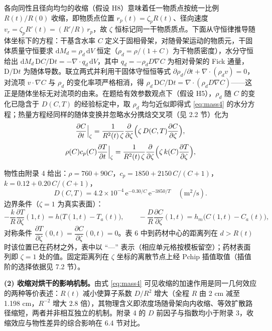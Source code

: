 \documentclass[12pt,a4paper]{ctexart}
\newcommand{\pdd}[2]{\dfrac{\partial #1}{\partial #2}}
\begin{document}
各向同性且径向均匀的收缩（假设 H8）意味着任一物质点按统一比例 $R(t)/R(0)$ 收缩，即物质点位置 $r_p(t)=\zeta_pR(t)$、径向速度 $v_r=\zeta_pR'(t)=(R'/R)\,r_p$，故 $\zeta$ 恒标记同一干物质质点。下面从守恒律推导随体坐标下的方程：干基含水率 $C$ 定义于固相骨架，对随骨架运动的物质元，干固体质量守恒要求 $\mathrm{d}M_d=\rho_d\,\mathrm{d}V$ 恒定（$\rho_d=\rho/(1+C)$ 为干物质密度），水分守恒给出 $\mathrm{d}M_d\,\mathrm{D}C/\mathrm{D}t=-\nabla\cdot q_d\,\mathrm{d}V$，其中 $q_d=-\rho_d D\nabla C$ 为相对骨架的 Fick 通量\cite{whitaker}，$\mathrm{D}/\mathrm{D}t$ 为随体导数。联立两式并利用干固体守恒恒等式 $\partial\rho_d/\partial t+\nabla\cdot(\rho_d v)=0$，对流项 $v\cdot\nabla C$ 与 $\rho_d$ 的变化率项严格相消，得 $\rho_d\,\mathrm{D}C/\mathrm{D}t=\nabla\cdot(\rho_d D\nabla C)$——这正是随体坐标无对流项的由来。在题给有效参数观点下（假设 H5），$\rho_d$ 随 $C$ 的变化已隐含于 $D(C,T)$ 的经验标定中，取 $\rho_d$ 均匀近似即得式 \eqref{eq:mass4} 的水分方程；热量方程经同样的随体变换并忽略水分携焓交叉项（见 2.2 节）化为
\begin{equation}
\pdd{C}{t}\Big|_{\zeta}=\frac{1}{R^2(t)\,\zeta}\pdd{}{\zeta}\Bigl(\zeta\,D(C,T)\pdd{C}{\zeta}\Bigr),
\label{eq:mass4}
\end{equation}
\begin{equation}
\rho(C)c_p(C)\pdd{T}{t}\Big|_{\zeta}=\frac{1}{R^2(t)\,\zeta}\pdd{}{\zeta}\Bigl(\zeta\,k(C)\pdd{T}{\zeta}\Bigr),
\label{eq:heat4}
\end{equation}

物性由附录 4 给出：$\rho=760+90C$，$c_p=1850+2150\,C/(C+1)$，$k=0.12+0.20\,C/(C+1)$，
\begin{equation}
D(C,T)=4.2\times10^{-4}\,\mathrm{e}^{-0.30/C}\,\mathrm{e}^{-3850/T}\quad(\mathrm{m^2/s}).
\label{eq:D4}
\end{equation}
边界条件（$\zeta=1$ 为真实表面）：
\begin{equation}
-\frac{k}{R}\pdd{T}{\zeta}(1,t)=h\bigl(T(1,t)-T_a(t)\bigr),\qquad
-\frac{D}{R}\pdd{C}{\zeta}(1,t)=h_m\bigl(C(1,t)-C_a(t)\bigr),
\label{eq:bc4}
\end{equation}
对称条件 $\pdd{T}{\zeta}(0,t)=\pdd{C}{\zeta}(0,t)=0$。表 6 中到药材中心的距离列在 $d>R(t)$ 时该位置已在药材之外，表中以 ``---'' 表示（相应单元格按模板留空）；药材表面列即 $\zeta=1$ 处的值。固定距离列在 $\zeta$ 坐标的离散节点上经 Pchip 插值取值（插值阶的选择依据见 7.2 节）。

\textbf{(2) 收缩对烘干的影响机制。}由式 \eqref{eq:mass4} 可见收缩的加速作用是同一几何效应的两种等价表述：$R(t)$ 减小使算子系数 $D/R^2$ 增大（全程 $R$ 由 2 cm 减至 1.198 cm，$R^{-2}$ 增大 2.8 倍），其物理含义即浓度场随骨架向内收缩、等效扩散路径缩短，两者并非相互独立的机制。附录 4 的 $D$ 前因子与指数均小于附录 3，收缩效应与物性差异的综合影响在 6.4 节对比。
\end{document}
